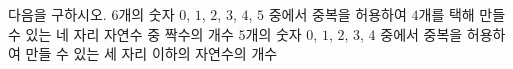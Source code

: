 다음을 구하시오.
 $6$개의 숫자 $0$, $1$, $2$, $3$, $4$, $5$ 중에서 중복을 허용하여 $4$개를 택해 만들 수 있는 네 자리 자연수 중 짝수의 개수
 $5$개의 숫자 $0$, $1$, $2$, $3$, $4$ 중에서 중복을 허용하여 만들 수 있는 세 자리 이하의 자연수의 개수
